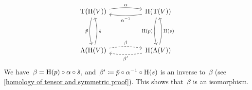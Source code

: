 \documentclass[a4paper,10pt,headings=standardclasses]{scrartcl}
\begin{document}
\begin{example}
\begin{enumerate}
      \[
        \begin{tikzcd}[column sep = huge, row sep = 4em]
          \dgTensor(\homology(V))
          \arrow[bend left = 9]{r}[above]{\alpha}
          \arrow[bend right = 15]{d}[left]{\tilde{p}}
          &
          \homology(\dgTensor(V))
          \arrow[bend left = 9]{l}[below]{\alpha^{-1}}
          \arrow[bend right = 15]{d}[left]{\homology(p)}
          \\
          \dgSymm(\homology(V))
          \arrow[bend right = 15]{u}[right]{\tilde{s}}
          \arrow[dashed, bend left = 9]{r}[above]{\beta}
          &
          \homology(\dgSymm(V))
          \arrow[bend right = 15]{u}[right]{\homology(s)}
          \arrow[dashed, bend left = 9]{l}[below]{\beta'}
        \end{tikzcd}
      \]
      We have~$\beta = \operatorname{H}(p) \circ \alpha \circ \tilde{s}$, and~$\beta' \coloneqq \tilde{p} \circ \alpha^{-1} \circ \operatorname{H}(s)$ is an inverse to~$\beta$ (see \cref{homology of tensor and symmetric proof}).
      This shows that~$\beta$ is an isomorphism.
  \end{enumerate}
\end{example}


\end{document}
